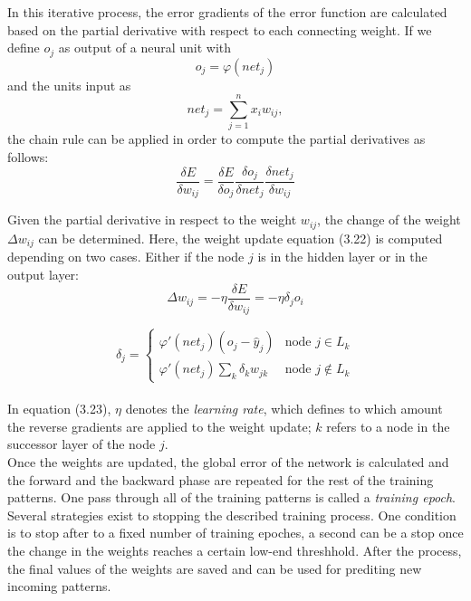 In this iterative process, the error gradients of the error function are calculated based on the partial derivative with respect to each connecting weight. If we define $o_j$ as output of a neural unit with
\begin{equation}
  o_j = \varphi(net_j)
\end{equation}
and the units input as 
\begin{equation}
  net_j = \sum_{j=1}^{n}x_{i}w_{ij},
\end{equation}
the chain rule can be applied in order to compute the partial derivatives as follows:
\begin{equation}
  \frac{\delta E}{\delta w_{ij}} = \frac{\delta E}{\delta o_j} \frac{\delta o_j}{\delta net_j} \frac{\delta net_j}{\delta w_{ij}}
\end{equation}

Given the partial derivative in respect to the weight $w_{ij}$, the change of the weight $\Delta w_{ij}$ can be determined. Here, the weight update equation (3.22) is computed depending on two cases. Either if the node $j$ is in the hidden layer or in the output layer:
\begin{equation}
  \Delta w_{ij} = -\eta \frac{\delta E}{\delta w_{ij}} = - \eta \delta_j o_i
\end{equation}

\begin{equation}
  \delta_j =
  \begin{cases}
    \varphi'(net_j)(o_j - \hat{y}_j) & \text{node $j \in L_k$}\\
    \varphi'(net_j) \sum_k \delta_k w_{jk} & \text{node $j \notin L_k$}
  \end{cases}
\end{equation}
\\
In equation (3.23), $\eta$ denotes the \textit{learning rate}, which defines to which amount the reverse gradients are applied to the weight update; $k$ refers to a node in the successor layer of the node $j$.\\

Once the weights are updated, the global error of the network is calculated and the forward and the backward phase are repeated for the rest of the training patterns. One pass through all of the training patterns is called a \textit{training
epoch}. Several strategies exist to stopping the described training process. One condition is to stop after to a fixed number of training epoches, a second can be a stop once the change in the weights reaches a certain low-end threshhold. After the process, the final values of the weights are saved and can be used for prediting new incoming patterns.

